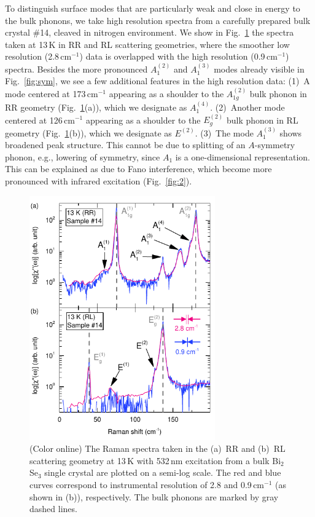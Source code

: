 \documentclass[reprint,aps,pra,superscriptaddress,amsmath,amssymb,linenumbers,longbibliography]{revtex4-1}
\begin{document}
To distinguish surface modes that are particularly weak and close in energy to the bulk phonons, we take high resolution spectra from a carefully prepared bulk crystal \#14, cleaved in nitrogen environment.
We show in Fig.~\ref{fig:hiRes} the spectra taken at 13\,K in RR and RL scattering geometries, where the smoother low resolution (2.8\,cm$^{-1}$) data is overlapped with the high resolution (0.9\,cm$^{-1}$) spectra.
Besides the more pronounced $A_1^{(2)}$ and $A_1^{(3)}$ modes already visible in Fig.~\ref{fig:sym}, we see a few additional features in the high resolution data:
(1)~A mode centered at 173\,cm$^{-1}$ appearing as a shoulder to the $A_{1g}^{(2)}$ bulk phonon in RR geometry (Fig.~\ref{fig:hiRes}(a)), which we designate as $A_{1}^{(4)}$.
(2)~Another mode centered at 126\,cm$^{-1}$ appearing as a shoulder to the $E_{g}^{(2)}$ bulk phonon in RL geometry (Fig.~\ref{fig:hiRes}(b)), which we designate as $E^{(2)}$.
(3)~The mode $A_{1}^{(3)}$ shows broadened peak structure. This cannot be due to splitting of an $A$-symmetry phonon, e.g., lowering of symmetry, since $A_1$ is a one-dimensional representation. 
This can be explained as due to Fano interference, which become more pronounced with infrared excitation (Fig.~\ref{fig:2}).
%
\begin{figure}[t]
	\includegraphics[width=8cm]{Fig4.pdf}
	\caption{\label{fig:hiRes}(Color online)
		The Raman spectra taken in the (a)~RR and (b)~RL scattering geometry at 13\,K with 532\,nm excitation from a bulk Bi$_2$Se$_3$ single crystal are plotted on a semi-log scale.
		The red and blue curves correspond to instrumental resolution of 2.8 and 0.9\,cm$^{-1}$ (as shown in (b)), respectively.
		The bulk phonons are marked by gray dashed lines.
	}
\end{figure}
\end{document}
